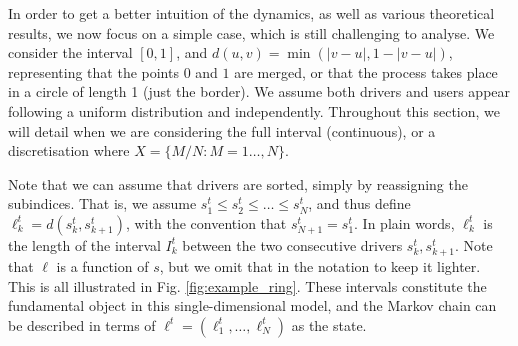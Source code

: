 \documentclass[12pt,english]{article}
\begin{document}
In order to get a better intuition of the dynamics, as well as various theoretical results, we now focus on a simple case, which is still challenging to analyse. We consider the interval $[0,1]$, and $d(u,v)=\min(|v-u|,1-|v-u|)$, representing that the points $0$ and $1$ are merged, or that the process takes place in a circle of length 1 (just the border). We assume both drivers and users appear following a uniform distribution and independently. Throughout this section, we will detail when we are considering the full interval (continuous), or a discretisation where $X=\{M/N: M=1\ldots,N\}$.

Note that we can assume that drivers are sorted, simply by reassigning the subindices. That is, we assume $s_1^t \leq s_2^t \leq \ldots \leq s_N^t$, and thus define $\ell_k^t=d(s_k^t,s_{k+1}^t)$, with the convention that $s^t_{N+1}=s^t_1$. In plain words, $\ell_k^t$ is the length of the interval $I_k^t$ between the two consecutive drivers $s^t_k,s^t_{k+1}$. Note that $\ell$ is a function of $s$, but we omit that in the notation to keep it lighter. This is all illustrated in Fig. \ref{fig:example_ring}. 
These intervals constitute the fundamental object in this single-dimensional model, and the Markov chain can be described in terms of $\ell^t=(\ell^t_1,\ldots,\ell^t_N)$ as the state.
\end{document}
